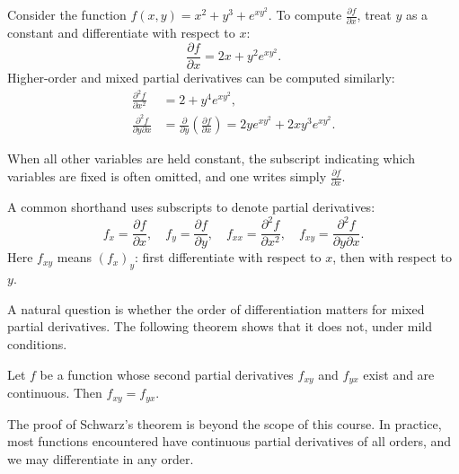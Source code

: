 \documentclass[a4paper]{article}
\begin{document}
\begin{eg}
  Consider the function $f(x, y) = x^2 + y^3 + e^{xy^2}$. To compute $\frac{\partial f}{\partial x}$, treat $y$ as a constant and differentiate with respect to $x$:
  \[
    \frac{\partial f}{\partial x} = 2x + y^2e^{xy^2}.
  \]
  Higher-order and mixed partial derivatives can be computed similarly:
  \begin{align*}
    \frac{\partial^2f}{\partial x^2} &= 2 + y^4e^{xy^2},\\
    \frac{\partial^2 f}{\partial y\partial x} &= \frac{\partial}{\partial y}\left(\frac{\partial f}{\partial x}\right) = 2ye^{xy^2} + 2xy^{3}e^{xy^2}.
  \end{align*}
\end{eg}
\begin{remark}
  When all other variables are held constant, the subscript indicating which variables are fixed is often omitted, and one writes simply $\frac{\partial f}{\partial x}$.
\end{remark}

\begin{notation}
  A common shorthand uses subscripts to denote partial derivatives:
  \[
    f_x = \frac{\partial f}{\partial x},\quad f_y = \frac{\partial f}{\partial y}, \quad f_{xx} = \frac{\partial^2 f}{\partial x^2},\quad f_{xy} = \frac{\partial^2 f}{\partial y\partial x}.
  \]
  Here $f_{xy}$ means $(f_x)_y$: first differentiate with respect to $x$, then with respect to $y$.
\end{notation}

A natural question is whether the order of differentiation matters for mixed partial derivatives. The following theorem shows that it does not, under mild conditions.

\begin{thm}
  Let $f$ be a function whose second partial derivatives $f_{xy}$ and $f_{yx}$ exist and are continuous. Then $f_{xy} = f_{yx}$.
\end{thm}

\begin{remark}
  The proof of Schwarz's theorem is beyond the scope of this course. In practice, most functions encountered have continuous partial derivatives of all orders, and we may differentiate in any order.
\end{remark}
\end{document}

